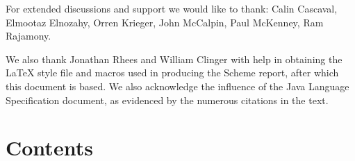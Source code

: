 For extended discussions and support we would like to thank: Calin
Cascaval, Elmootaz Elnozahy, Orren Krieger, John McCalpin, Paul
McKenney, Ram Rajamony.

We also thank Jonathan Rhees and William Clinger with help in
obtaining the \LaTeX{} style file and macros used in producing the
Scheme report, after which this document is based. We also acknowledge
the influence of the Java Language Specification \cite{jls2} document,
as evidenced by the numerous citations in the text.



\vfill
\eject


\chapter*{Contents}
\addvspace{3.5pt}                  %
\renewcommand{\tocshrink}{-3.5pt}  %
{\footnotesize
\tableofcontents
}

\vfill
\eject


